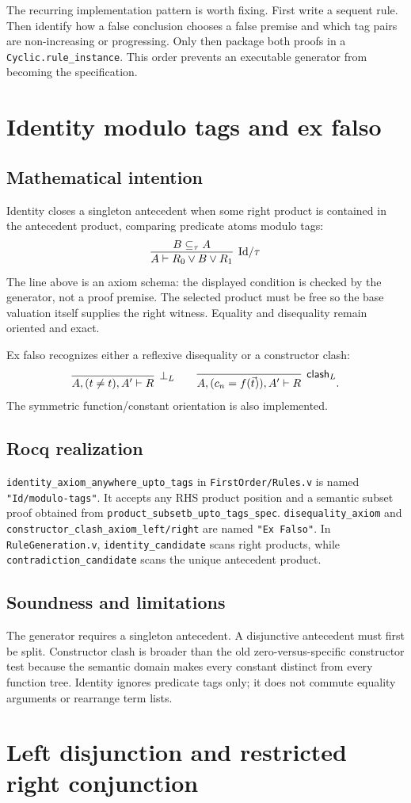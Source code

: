 \documentclass[11pt,oneside]{book}
\DeclareRobustCommand{\code}[1]{\nolinkurl{#1}}
\DeclareRobustCommand{\file}[1]{\nolinkurl{#1}}
\newcommand{\src}[2]{\code{#2} in \file{#1}}
\newcommand{\mathintent}{\subsection*{Mathematical intention}}
\newcommand{\rocqreal}{\subsection*{Rocq realization}}
\newcommand{\soundlim}{\subsection*{Soundness and limitations}}
\begin{document}
The recurring implementation pattern is worth fixing.  First write a sequent
rule.  Then identify how a false conclusion chooses a false premise and which
tag pairs are non-increasing or progressing.  Only then package both proofs in
a \code{Cyclic.rule_instance}.  This order prevents an executable generator
from becoming the specification.

\section{Identity modulo tags and ex falso}

\mathintent

Identity closes a singleton antecedent when some right product is contained in
the antecedent product, comparing predicate atoms modulo tags:
\[
 \infer[\mathrm{Id}/\tau]
       {A\vdash R_0\lor B\lor R_1}
       {B\subseteq_{\tau}A}
\]
The line above is an axiom schema: the displayed condition is checked by the
generator, not a proof premise.  The selected product must be free so the base
valuation itself supplies the right witness.  Equality and disequality remain
oriented and exact.

Ex falso recognizes either a reflexive disequality or a constructor clash:
\[
 \infer[\bot_L]{A,(t\ne t),A'\vdash R}{ }
 \qquad
 \infer[\mathsf{clash}_L]
       {A,(c_n=f(\vec t)),A'\vdash R}{ }.
\]
The symmetric function/constant orientation is also implemented.

\rocqreal

\src{FirstOrder/Rules.v}{identity_axiom_anywhere_upto_tags} is named
\code{"Id/modulo-tags"}.  It accepts any RHS product position and a semantic
subset proof obtained from \code{product_subsetb_upto_tags_spec}.
\code{disequality_axiom} and \code{constructor_clash_axiom_left/right} are
named \code{"Ex Falso"}.  In \file{RuleGeneration.v},
\code{identity_candidate} scans right products, while
\code{contradiction_candidate} scans the unique antecedent product.

\soundlim

The generator requires a singleton antecedent.  A disjunctive antecedent must
first be split.  Constructor clash is broader than the old zero-versus-specific
constructor test because the semantic domain makes every constant distinct
from every function tree.  Identity ignores predicate tags only; it does not
commute equality arguments or rearrange term lists.

\section{Left disjunction and restricted right conjunction}
\end{document}
